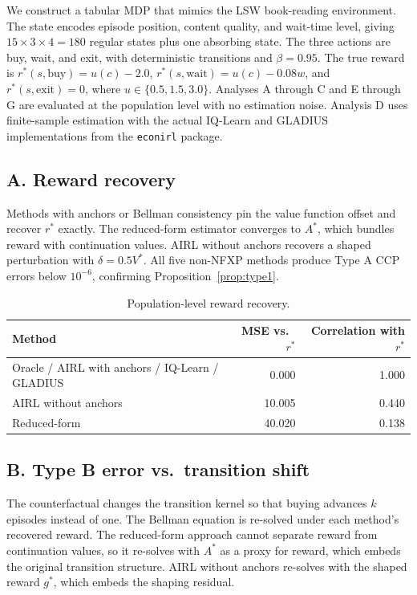 \documentclass[11pt]{article}
\begin{document}
We construct a tabular MDP that mimics the LSW book-reading environment. The state encodes episode position, content quality, and wait-time level, giving $15 \times 3 \times 4 = 180$ regular states plus one absorbing state. The three actions are buy, wait, and exit, with deterministic transitions and $\beta = 0.95$. The true reward is $r^*(s,\text{buy}) = u(c) - 2.0$, $r^*(s,\text{wait}) = u(c) - 0.08w$, and $r^*(s,\text{exit}) = 0$, where $u \in \{0.5, 1.5, 3.0\}$. Analyses A through C and E through G are evaluated at the population level with no estimation noise. Analysis D uses finite-sample estimation with the actual IQ-Learn and GLADIUS implementations from the \texttt{econirl} package.

\subsection{A. Reward recovery}

Methods with anchors or Bellman consistency pin the value function offset and recover $r^*$ exactly. The reduced-form estimator converges to $A^*$, which bundles reward with continuation values. AIRL without anchors recovers a shaped perturbation with $\delta = 0.5 V^*$. All five non-NFXP methods produce Type A CCP errors below $10^{-6}$, confirming Proposition~\ref{prop:type1}.

\begin{table}[H]
\centering
\begin{tabular}{lrr}
\toprule
Method & MSE vs.\ $r^*$ & Correlation with $r^*$ \\
\midrule
Oracle / AIRL with anchors / IQ-Learn / GLADIUS & 0.000 & 1.000 \\
AIRL without anchors & 10.005 & 0.440 \\
Reduced-form & 40.020 & 0.138 \\
\bottomrule
\end{tabular}
\caption{Population-level reward recovery.}
\label{tab:reward}
\end{table}

\subsection{B. Type B error vs.\ transition shift}

The counterfactual changes the transition kernel so that buying advances $k$ episodes instead of one. The Bellman equation is re-solved under each method's recovered reward. The reduced-form approach cannot separate reward from continuation values, so it re-solves with $A^*$ as a proxy for reward, which embeds the original transition structure. AIRL without anchors re-solves with the shaped reward $g^*$, which embeds the shaping residual.
\end{document}
